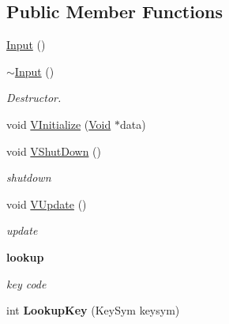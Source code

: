 \subsection*{Public Member Functions}
\begin{Indent}{\bf }\par
{\em \label{_amgrpd41d8cd98f00b204e9800998ecf8427e}
 }\begin{DoxyCompactItemize}
\item 
\hyperlink{classPlatform_1_1Input_1_1Linux_1_1Input_a4d092b21c9937be42de3ec9b182959a8}{Input} ()
\item 
\hypertarget{classPlatform_1_1Input_1_1Linux_1_1Input_a4d8e2fcc8604b4dab1dd382090c7ed24}{
\hyperlink{classPlatform_1_1Input_1_1Linux_1_1Input_a4d8e2fcc8604b4dab1dd382090c7ed24}{$\sim$Input} ()}
\label{classPlatform_1_1Input_1_1Linux_1_1Input_a4d8e2fcc8604b4dab1dd382090c7ed24}

\begin{DoxyCompactList}\small\item\em Destructor. \item\end{DoxyCompactList}\item 
void \hyperlink{classPlatform_1_1Input_1_1Linux_1_1Input_adfac30a8469aab931f5212c251104857}{VInitialize} (\hyperlink{structVoid}{Void} $\ast$data)
\item 
\hypertarget{classPlatform_1_1Input_1_1Linux_1_1Input_af9c9fde24fc622e5c362d2c8ffdd71ef}{
void \hyperlink{classPlatform_1_1Input_1_1Linux_1_1Input_af9c9fde24fc622e5c362d2c8ffdd71ef}{VShutDown} ()}
\label{classPlatform_1_1Input_1_1Linux_1_1Input_af9c9fde24fc622e5c362d2c8ffdd71ef}

\begin{DoxyCompactList}\small\item\em shutdown \item\end{DoxyCompactList}\item 
\hypertarget{classPlatform_1_1Input_1_1Linux_1_1Input_ab2969ab4b1eef0f36a2092ba9d3f4c63}{
void \hyperlink{classPlatform_1_1Input_1_1Linux_1_1Input_ab2969ab4b1eef0f36a2092ba9d3f4c63}{VUpdate} ()}
\label{classPlatform_1_1Input_1_1Linux_1_1Input_ab2969ab4b1eef0f36a2092ba9d3f4c63}

\begin{DoxyCompactList}\small\item\em update \item\end{DoxyCompactList}\end{DoxyCompactItemize}
\end{Indent}
\begin{Indent}{\bf lookup}\par
{\em \label{_amgrpbd95200a60e47be9736970fd665f6195}
 key code }\begin{DoxyCompactItemize}
\item 
\hypertarget{classPlatform_1_1Input_1_1Linux_1_1Input_a121e81116b00787083c4e9fb7e4f326c}{
int {\bfseries LookupKey} (KeySym keysym)}
\label{classPlatform_1_1Input_1_1Linux_1_1Input_a121e81116b00787083c4e9fb7e4f326c}

\end{DoxyCompactItemize}
\end{Indent}
